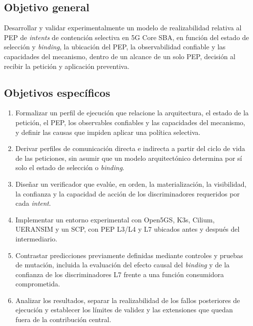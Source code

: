 \subsection{Objetivo general}

Desarrollar y validar experimentalmente un modelo de realizabilidad relativa al PEP de \textit{intents} de contención selectiva en 5G Core SBA, en función del estado de selección y \textit{binding}, la ubicación del PEP, la observabilidad confiable y las capacidades del mecanismo, dentro de un alcance de un solo PEP, decisión al recibir la petición y aplicación preventiva.

\subsection{Objetivos específicos}

\begin{enumerate}
    \item Formalizar un perfil de ejecución que relacione la arquitectura, el estado de la petición, el PEP, los observables confiables y las capacidades del mecanismo, y definir las causas que impiden aplicar una política selectiva.

    \item Derivar perfiles de comunicación directa e indirecta a partir del ciclo de vida de las peticiones, sin asumir que un modelo arquitectónico determina por sí solo el estado de selección o \textit{binding}.

    \item Diseñar un verificador que evalúe, en orden, la materialización, la visibilidad, la confianza y la capacidad de acción de los discriminadores requeridos por cada \textit{intent}.

    \item Implementar un entorno experimental con Open5GS, K3s, Cilium, UERANSIM y un SCP, con PEP L3/L4 y L7 ubicados antes y después del intermediario.

    \item Contrastar predicciones previamente definidas mediante controles y pruebas de mutación, incluida la evaluación del efecto causal del \textit{binding} y de la confianza de los discriminadores L7 frente a una función consumidora comprometida.

    \item Analizar los resultados, separar la realizabilidad de los fallos posteriores de ejecución y establecer los límites de validez y las extensiones que quedan fuera de la contribución central.
\end{enumerate}

